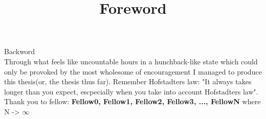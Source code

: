 \title{Foreword}

Backword
\\

Through what feels like uncountable hours in a hunchback-like state which could only be provoked by the most wholesome of encouragement I managed to produce this thesis(or, the thesis thus far). Remember Hofstadters law: "It always takes longer than you expect, escpecially when you take into account Hofstadters law".
Thank you to fellow:  \textbf{Fellow0, Fellow1, Fellow2, Fellow3, ..., FellowN} where N -> $\infty$